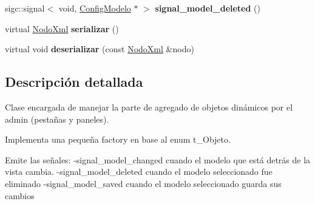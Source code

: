 \begin{DoxyCompactItemize}
\item 
\hypertarget{classAdminConfigObjManager_af50cdd1b684a7170cf35836c80768763}{sigc\-::signal$<$ void, \*
\hyperlink{classConfigModelo}{\-Config\-Modelo} $\ast$ $>$ {\bfseries signal\-\_\-model\-\_\-deleted} ()}\label{classAdminConfigObjManager_af50cdd1b684a7170cf35836c80768763}

\item 
\hypertarget{classAdminConfigObjManager_aa25ec5375405a77449aa2c9b345f42c9}{virtual \hyperlink{classTiXmlElement}{\-Nodo\-Xml} {\bfseries serializar} ()}\label{classAdminConfigObjManager_aa25ec5375405a77449aa2c9b345f42c9}

\item 
\hypertarget{classAdminConfigObjManager_a2b266588c890c4fa828daa716ea5653e}{virtual void {\bfseries deserializar} (const \hyperlink{classTiXmlElement}{\-Nodo\-Xml} \&nodo)}\label{classAdminConfigObjManager_a2b266588c890c4fa828daa716ea5653e}

\end{DoxyCompactItemize}


\subsection{\-Descripción detallada}
\-Clase encargada de manejar la parte de agregado de objetos dinámicos por el admin (pestañas y paneles).

\-Implementa una pequeña factory en base al enum t\-\_\-\-Objeto.

\-Emite las señales\-: -\/signal\-\_\-model\-\_\-changed cuando el modelo que está detrás de la vista cambia. -\/signal\-\_\-model\-\_\-deleted cuando el modelo seleccionado fue eliminado -\/signal\-\_\-model\-\_\-saved cuando el modelo seleccionado guarda sus cambios 

